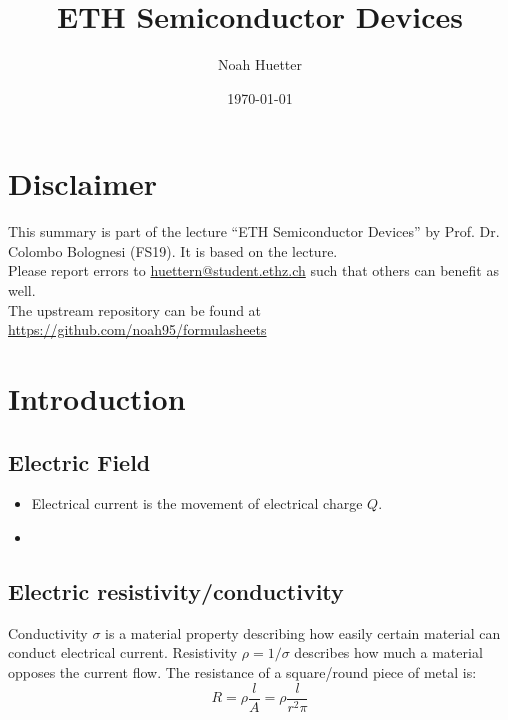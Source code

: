 \documentclass[a4paper, fontsize=8pt, landscape, DIV=1]{scrartcl}
\title{ETH Semiconductor Devices}
\author{Noah Huetter}
\date{\today}
\begin{document}
\setcounter{secnumdepth}{2} %
\begin{multicols*}{4}
	\section*{Disclaimer}
	This summary is part of the lecture ``ETH Semiconductor Devices'' by Prof. Dr. Colombo Bolognesi (FS19). It is based on the lecture. \\[6pt]
	Please report errors to \href{mailto:huettern@student.ethz.ch}{huettern@student.ethz.ch} such that others can benefit as well.\\[6pt]	
  The upstream repository can be found at \href{https://github.com/noah95/formulasheets}{https://github.com/noah95/formulasheets}
	\vfill\null
	\pagebreak
  \maketitle 
  \thispagestyle{fancy}

  \section{Introduction}
    \subsection{Electric Field}
    \begin{itemize}
      \item Electrical current is the movement of electrical charge $Q$.
      \item 
    \end{itemize}

    \subsection{Electric resistivity/conductivity}
    Conductivity $\sigma$ is a material property describing how easily certain material can conduct electrical current. Resistivity $\rho = 1/\sigma$ describes how much a material opposes the current flow. The resistance of a square/round piece of metal is:
    \[R=\rho\frac{l}{A}=\rho\frac{l}{r^2\pi}\]


\end{multicols*}
\end{document}
